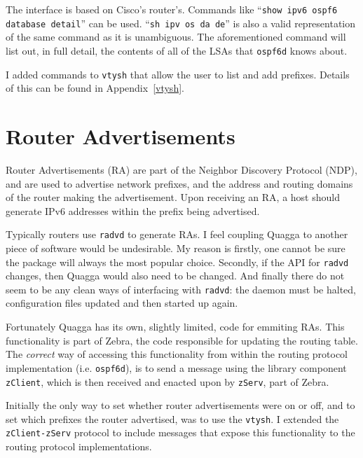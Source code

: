 \documentclass[12pt]{report}
\begin{document}
The interface is based on Cisco's router's. Commands like
``\texttt{show ipv6 ospf6 database detail}'' can be used. ``\texttt{sh ipv os
da de}'' is also a valid representation of the same command as it is
unambiguous. The aforementioned command will list out, in full detail, the
contents of all of the LSAs that \texttt{ospf6d} knows about. 

I added commands to \texttt{vtysh} that allow the user to list and add
prefixes. Details of this can be found in Appendix~\ref{vtysh}. 

\section{Router Advertisements}
Router Advertisements (RA)  are part of
the Neighbor Discovery Protocol (NDP),  and are used to advertise network prefixes, and the address and
routing domains of the router making the advertisement. Upon receiving
an RA, a host should generate IPv6 addresses within the prefix being advertised. 

Typically routers use \texttt{radvd}  to generate RAs. I feel coupling Quagga to another
piece of software would be undesirable. My reason is firstly, one cannot
be sure the package will always the most popular choice. Secondly, if the
API for \texttt{radvd} changes, then Quagga would also need to be changed. And
finally there do not seem to be any clean ways of interfacing with
\texttt{radvd}: the daemon must be halted, configuration files updated and then
started up again.

Fortunately Quagga has its own, slightly limited, code for emmiting RAs. This
functionality is part of Zebra, the code responsible for updating the routing
table. The \emph{correct} way of accessing this functionality from within the
routing protocol implementation (i.e. \texttt{ospf6d}), is to send a message
using the library component \texttt{zClient}, which is then received and
enacted upon by \texttt{zServ}, part of Zebra. 

Initially the only way to set whether router advertisements were on or off, and
to set which prefixes the router advertised, was to use the \texttt{vtysh}. I
extended the \texttt{zClient-zServ} protocol to include messages that expose
this functionality to the routing protocol implementations. 
\end{document}
